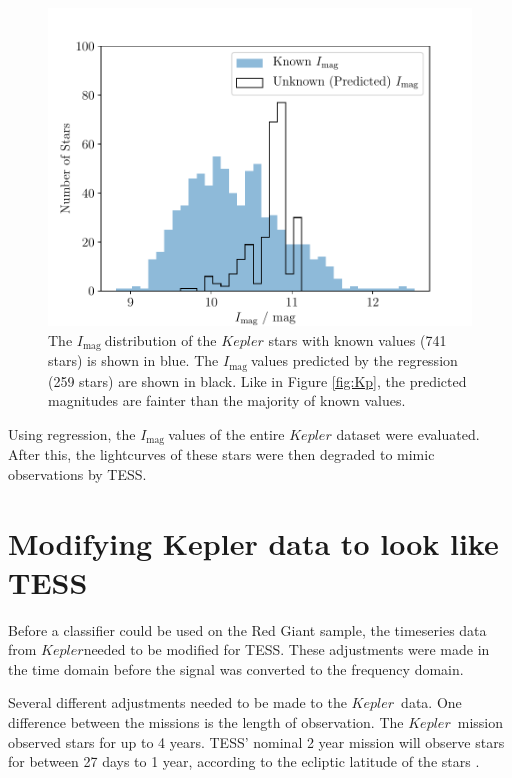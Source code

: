 \documentclass[a4paper,fleqn,usenatbib,useAMS]{mnras}
\newcommand{\kep}{\ensuremath{Kepler}\:}
\newcommand{\imag}{\ensuremath{I_{\textrm{mag}}\:}}
\begin{document}
\begin{figure}
	\centering
	\includegraphics[scale=0.5]{Plot3_Imag_trained_distribution}
	\caption{The \imag distribution of the $Kepler$ stars with known values (741 stars) is shown in blue. The \imag values predicted by the regression (259 stars) are shown in black. Like in Figure \ref{fig:Kp}, the predicted magnitudes are fainter than the majority of known values.}	
	\label{fig:imag train}
\end{figure}

Using regression, the \imag values of the entire $Kepler$ dataset were evaluated. After this, the lightcurves of these stars were then degraded to mimic observations by TESS.


\section{Modifying Kepler data to look like TESS}
\label{sect: tess-like}

Before a classifier could be used on the Red Giant sample, the timeseries data from \kep needed to be modified for TESS. These adjustments were made in the time domain before the signal was converted to the frequency domain.

Several different adjustments needed to be made to the \kep \ data. One difference between the missions is the length of observation. The \kep \ mission observed stars for up to 4 years. TESS' nominal 2 year mission will observe stars for between 27 days to 1 year, according to the ecliptic latitude of the stars \citep{ricker_transiting_2014}.
\end{document}
